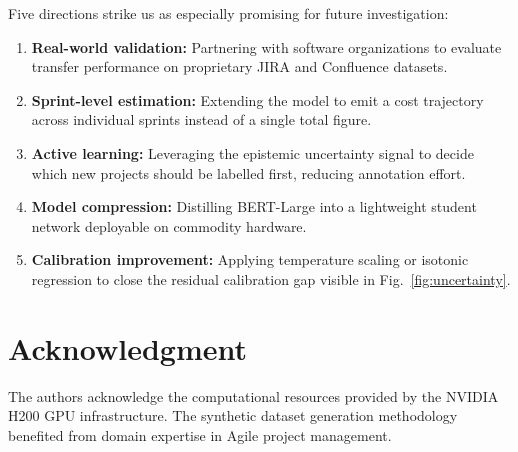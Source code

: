 \documentclass[conference]{IEEEtran}
\begin{document}
Five directions strike us as especially promising for future investigation:

\begin{enumerate}
    \item \textbf{Real-world validation:} Partnering with software organizations to evaluate transfer performance on proprietary JIRA and Confluence datasets.
    \item \textbf{Sprint-level estimation:} Extending the model to emit a cost trajectory across individual sprints instead of a single total figure.
    \item \textbf{Active learning:} Leveraging the epistemic uncertainty signal to decide which new projects should be labelled first, reducing annotation effort.
    \item \textbf{Model compression:} Distilling BERT-Large into a lightweight student network deployable on commodity hardware.
    \item \textbf{Calibration improvement:} Applying temperature scaling or isotonic regression to close the residual calibration gap visible in Fig.~\ref{fig:uncertainty}.
\end{enumerate}

\section*{Acknowledgment}

The authors acknowledge the computational resources provided by the NVIDIA H200 GPU infrastructure. The synthetic dataset generation methodology benefited from domain expertise in Agile project management.
\end{document}
